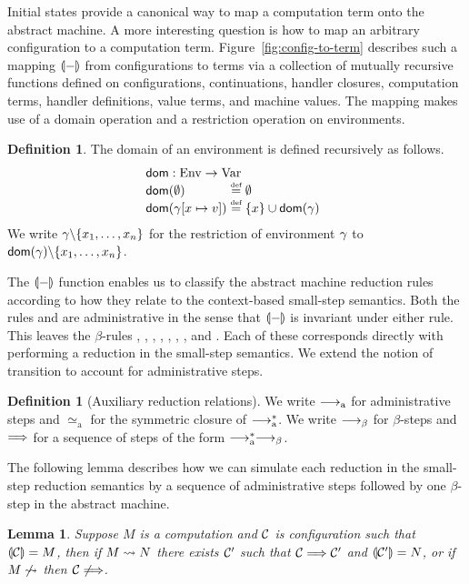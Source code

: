 \documentclass[12pt,phd,lfcs,twoside,openright,logo,leftchapter,normalheadings]{infthesis}
\theoremstyle{plain}
\newtheorem{lemma}[theorem]{Lemma}
\theoremstyle{definition}
\newtheorem{definition}[theorem]{Definition}
\begin{document}
Initial states provide a canonical way to map a computation term onto
the abstract machine.
%
A more interesting question is how to map an arbitrary configuration
to a computation term.
%
Figure~\ref{fig:config-to-term} describes such a mapping $\llparenthesis - \rrparenthesis$
from configurations to terms via a collection of mutually recursive
functions defined on configurations, continuations, handler closures,
computation terms, handler definitions, value terms, and machine
values. The mapping makes use of a domain operation and a restriction
operation on environments.
%
\begin{definition}
  The domain of an environment is defined recursively as follows.
  \[
    \bl
    \dom : \MEnvCat \to \VarCat\\
    \ba{@{}l@{~}c@{~}l}
      \dom(\emptyset) &\defas& \emptyset\\
      \dom(\env[x \mapsto v]) &\defas& \{x\} \cup \dom(\env)
    \ea
    \el
  \]
  We write $\gamma \backslash \{x_1, \dots, x_n\}$ for the restriction of
  environment $\gamma$ to $\mathsf{dom}(\gamma) \backslash \{x_1, \dots, x_n\}$.
\end{definition}
%
The $\llparenthesis - \rrparenthesis$ function enables us to classify the abstract machine
reduction rules according to how they relate to the context-based
small-step semantics.
%
Both the rules  and  are administrative in the
sense that $\llparenthesis - \rrparenthesis$ is invariant under either rule.
%
This leaves the $\beta$-rules , , ,
, , , , and
. Each of these corresponds directly with performing a
reduction in the small-step semantics. We extend the notion of
transition to account for administrative steps.
%
\begin{definition}[Auxiliary reduction relations]
  We write $\longrightarrow_{\textrm{a}}$ for administrative steps and
  $\simeq_{\textrm{a}}$ for the symmetric closure of
  $\longrightarrow_{\textrm{a}}^*$. We write $\longrightarrow_\beta$ for
  $\beta$-steps and $\Longrightarrow$ for a sequence of steps of the form
  $\longrightarrow_{\textrm{a}}^\ast \longrightarrow_\beta$.
\end{definition}
%
The following lemma describes how we can simulate each reduction in
the small-step reduction semantics by a sequence of administrative
steps followed by one $\beta$-step in the abstract machine.
%
\begin{lemma}
\label{lem:machine-simulation}
Suppose $M$ is a computation and $\mathcal{C}$ is configuration such that
$\llparenthesis \mathcal{C} \rrparenthesis = M$, then if $M \leadsto N$ there exists $\mathcal{C}'$ such
that $\mathcal{C} \Longrightarrow \mathcal{C}'$ and $\llparenthesis \mathcal{C}' \rrparenthesis = N$, or if
$M \not\leadsto$ then $\mathcal{C} \not\Longrightarrow$.
\end{lemma}
\end{document}
